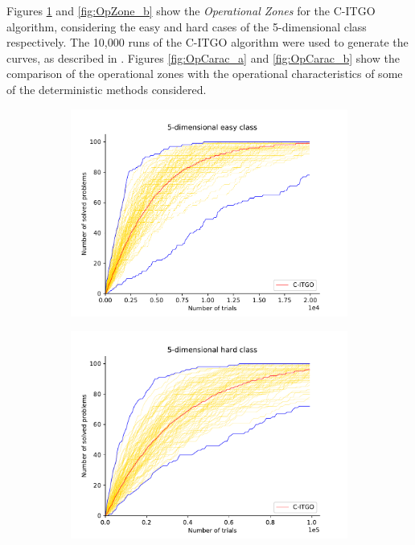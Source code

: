 

Figures \ref{fig:OpZone_a} and \ref{fig:OpZone_b} show the \textit{Operational Zones} for the C-ITGO algorithm, considering the easy and hard cases of the 5-dimensional class respectively. The 10,000 runs of the C-ITGO algorithm were used to generate the curves, as described in \cite{NAT}. Figures \ref{fig:OpCarac_a} and \ref{fig:OpCarac_b} show the comparison of the operational zones with the operational characteristics of some of the deterministic methods considered.



\begin{figure}[h]
    \centering
    \begin{subfigure}{.5\textwidth}
      \centering
      \includegraphics[width=1.1\linewidth]{Imgs/mult_5E}
      \caption{}
      \label{fig:OpZone_a}
    \end{subfigure}%
    \begin{subfigure}{.5\textwidth}
      \centering
      \includegraphics[width=1.1\linewidth]{Imgs/mult_5H}

\end{subfigure}
\end{figure}

